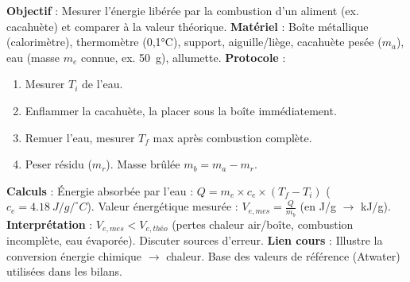 \documentclass[11pt]{article}
\begin{document}
\begin{experience}
\textbf{Objectif} : Mesurer l'énergie libérée par la combustion d'un aliment (ex. cacahuète) et comparer à la valeur théorique.
\textbf{Matériel} : Boîte métallique (calorimètre), thermomètre (0,1°C), support, aiguille/liège, cacahuète pesée ($m_a$), eau (masse $m_e$ connue, ex. \SI{50}{g}), allumette.
\textbf{Protocole} :
\begin{enumerate}
\item Mesurer $T_i$ de l'eau.
\item Enflammer la cacahuète, la placer sous la boîte immédiatement.
\item Remuer l'eau, mesurer $T_f$ max après combustion complète.
\item Peser résidu ($m_r$). Masse brûlée $m_b = m_a - m_r$.
\end{enumerate}
\textbf{Calculs} :
Énergie absorbée par l'eau : $Q = m_e \times c_e \times (T_f - T_i)$ ($c_e = \SI{4,18}{J/g/^\circ C}$).
Valeur énergétique mesurée : $V_{e,mes} = \frac{Q}{m_b}$ (en J/g $\rightarrow$ kJ/g).
\textbf{Interprétation} : $V_{e,mes} < V_{e,théo}$ (pertes chaleur air/boîte, combustion incomplète, eau évaporée). Discuter sources d'erreur.
\textbf{Lien cours} : Illustre la conversion énergie chimique $\rightarrow$ chaleur. Base des valeurs de référence (Atwater) utilisées dans les bilans.
\end{experience}
\end{document}
